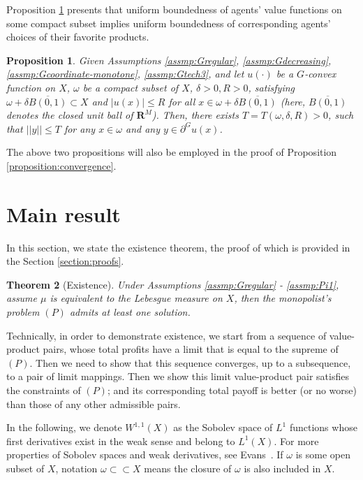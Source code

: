 \documentclass[a4paper, 11pt]{amsart}
\numberwithin{equation}{section}
\theoremstyle{plain}
\newtheorem{theorem}{Theorem}[section]
\newtheorem{proposition}[theorem]{Proposition}
\theoremstyle{definition}
\theoremstyle{remark}
\newcommand{\R}{\mathbf{R}}
\begin{document}
Proposition \ref{Subdiff/Bdd} presents that uniform boundedness of agents' value functions on some compact subset implies uniform boundedness of corresponding agents' choices of their favorite products. 

\begin{proposition}\label{Subdiff/Bdd}
	Given Assumptions \ref{assmp:Gregular}, \ref{assmp:Gdecreasing}, \ref{assmp:Gcoordinate-monotone}, \ref{assmp:Gtech3}, and let $u(\cdot)$ be a $G$-convex function on $X$, $\omega$ be a compact subset of $X$, $\delta>0, R>0$, satisfying $\omega+\delta\overline{B(0,1)}\subset X$ and $|u(x)|\le R$ for all $x\in \omega + \delta \overline{B(0,1)}$ (here, $\overline{B(0,1)}$ denotes the closed unit ball of $\R^M$). Then, there exists $T = T(\omega,\delta, R) > 0$, such that $||y||\le T$ for any $x \in \omega$ and any $y\in \partial^Gu(x)$.
\end{proposition}

The above two propositions will also be employed in the proof of Proposition \ref{proposition:convergence}. 

\bigskip







\section{Main result}\label{section:mainresult}
In this section, we state the existence theorem, the proof of which is provided in the Section \ref{section:proofs}. 


\begin{theorem}[Existence]
	Under Assumptions \ref{assmp:Gregular} - \ref{assmp:Pi1},  assume $\mu$ is equivalent to the Lebesgue measure on $X$, then the monopolist's problem $(P)$ admits at least one solution.
\end{theorem}

Technically, in order to demonstrate existence, we start from a sequence of value-product pairs, whose total profits have a limit that is equal to the supreme of $(P)$.
Then we need to show that this sequence converges, up to a subsequence, to a pair of limit mappings. Then we show this limit value-product pair satisfies the constraints of $(P)$; and its corresponding total payoff is better (or no worse) than those of any other admissible pairs. \medskip

In the following, we denote $W^{1,1}(X)$ as the Sobolev space of $L^1$ functions whose first derivatives exist in the weak sense and belong to $L^1(X)$. For more properties of Sobolev spaces and weak derivatives, see Evans~\cite[Chapter 5]{Evans98}. If $\omega$ is some open subset of $X$, notation $\omega \subset \subset X$ means the closure of $\omega$ is also included in $X$.\medskip
\end{document}
